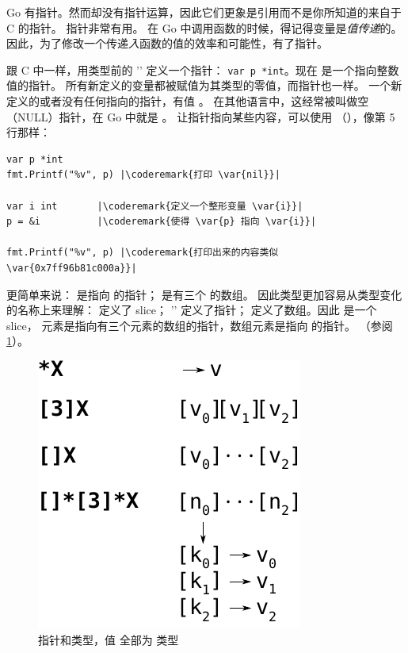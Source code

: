 \noindent{}
Go 有指针。然而却没有指针运算，因此它们更象是引用而不是你所知道的来自于 C 的指针。
指针非常有用。
在 Go 中调用函数的时候，得记得变量是\emph{值传递}的。
因此，为了修改一个传递\emph{入}函数的值的效率和可能性，有了指针。

跟 C 中一样，用类型前的 '\key{*}' 定义一个指针：
\lstinline{var p *int}。现在  是一个指向整数值的指针。
所有新定义的变量都被赋值为其类型的零值，而指针也一样。
一个新定义的或者没有任何指向的指针，有值 。
在其他语言中，这经常被叫做空（NULL）指针，在 Go 中就是 。
让指针指向某些内容，可以使用
（\func{\&}），像第 5 行那样：
\begin{lstlisting}[caption=Use of a pointer,label=src:pointers]
var p *int
fmt.Printf("%v", p) |\coderemark{打印 \var{nil}}|

var i int	    |\coderemark{定义一个整形变量 \var{i}}|
p = &i		    |\coderemark{使得 \var{p} 指向 \var{i}}|

fmt.Printf("%v", p) |\coderemark{打印出来的内容类似 \var{0x7ff96b81c000a}}|
\end{lstlisting}

更简单来说： 是指向  的指针； 是有三个  的数组。
因此类型更加容易从类型变化的名称上来理解：
\type{[]} 定义了 slice；
'\key{*}'
定义了指针；
\type{[size]} 定义了数组。因此  是一个 slice，
元素是指向有三个元素的数组的指针，数组元素是指向  的指针。
（参阅 \ref{fig:pointers}）。
\begin{figure}[h]
\caption[Pointers and types]{指针和类型，值  全部为  类型}
\label{fig:pointers}
\begin{center}
\includegraphics[scale=0.65]{fig/pointers.pdf}
\end{center}
\end{figure}


